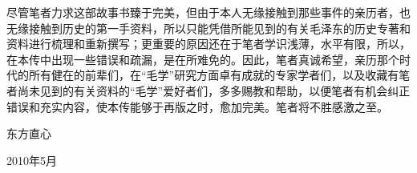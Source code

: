 \documentclass[../../dazhuan.tex]{subfiles}
\begin{document}
尽管笔者力求这部故事书臻于完美，但由于本人无缘接触到那些事件的亲历者，也无缘接触到历史的第一手资料，所以只能凭借所能见到的有关毛泽东的历史专著和资料进行梳理和重新撰写；更重要的原因还在于笔者学识浅薄，水平有限，所以，在本传中出现一些错误和疏漏，是在所难免的。因此，笔者真诚希望，亲历那个时代的所有健在的前辈们，在“毛学”研究方面卓有成就的专家学者们，以及收藏有笔者尚未见到的有关资料的“毛学”爱好者们，多多赐教和帮助，以便笔者有机会纠正错误和充实内容，使本传能够于再版之时，愈加完美。笔者将不胜感激之至。

\vspace{\baselineskip}

\hspace{18em} 东方直心

\hspace{18em} 2010年5月
    
\end{document}
